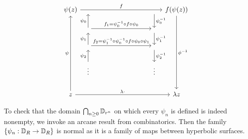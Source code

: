 \documentclass[../main.tex]{subfiles}
\begin{document}
\[
\begin{tikzcd}[column sep=tiny]
\psi(z) \ar[rrr, "f"] & {} &[8em] \ar[d, "\psi_0^{-1}"] & f(\psi(z)) \ar[dddd, "\phi\inv"] \\
& \ar[u, "\psi_0"] \ar[r, "f_1=\psi_0\inv \circ f \circ \psi_0"] & \ar[d, "\psi_1\inv"] & \\
& \ar[u, "\psi_1"] \ar[r, "f_2=\psi_1\inv \circ \psi_0\inv \circ f \circ \psi_0 \circ \psi_1"] & \ar[d, "\psi_2\inv"] & \\
& \vdots \ar[u, "\psi_2"] & \vdots & \\
z \ar[uuuu, "\psi"] \ar[rrr, "\lambda \cdot"] & & & \lambda z
\end{tikzcd}
\]

To check that the domain $\bigcap_{n \ge 0} \mathbb{D}_{r^n}$ on which every $\psi_n$ is defined is indeed nonempty, we invoke an arcane result from combinatorics. %
Then the family $\{ \psi_n : \mathbb{D}_R \to \mathbb{D}_R\}$ is normal as it is a family of maps between hyperbolic surfaces.
\end{document}
